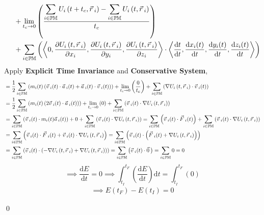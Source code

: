 \documentclass[12pt]{amsart}
\renewenvironment{proof}{{\bfseries Proof.}}{\qed}
\let\oldvec\vec
\renewcommand{\vec}[1]{\oldvec{#1}\hspace{0.1em}}
\begin{document}
\begin{proof}
\begin{align*}
& \quad \ + \lim_{t_c \to 0} \left ( \dfrac{ \displaystyle \sum_{i \in \mathbb{PM}}  U_i \left ( t+t_c, \vec{r}_i \right ) - \displaystyle \sum_{i \in \mathbb{PM}}  U_i \left ( t, \vec{r}_i \right ) }{t_c} \right ) \\
& \quad \ +  \displaystyle \sum_{i \in \mathbb{PM}} \left ( \left < 0, \dfrac{\partial  U_i \left ( t, \vec{r}_i \right )}{\partial x_i},\dfrac{\partial  U_i \left ( t, \vec{r}_i \right )}{\partial y_i}, \dfrac{\partial  U_i \left ( t, \vec{r}_i \right )}{\partial z_i} \right > \cdot \left < \dfrac{\mathrm{d} t}{\mathrm{d} t}, \dfrac{\mathrm{d} x_i(t)}{\mathrm{d} t}, \dfrac{\mathrm{d} y_i(t)}{\mathrm{d} t}, \dfrac{\mathrm{d} z_i(t)}{\mathrm{d} t}\right > \right )
\end{align*}
Apply \textbf{Explicit Time Invariance} and \textbf{Conservative System},
\begin{align*}
&= \dfrac{1}{2}\displaystyle\sum_{i \in \mathbb{PM}}\left( m_i (t) \left ( \vec{v}_i (t) \cdot \vec{a}_i (t) + \vec{a}_i (t) \cdot \vec{v}_i (t)\right) \right ) + \lim_{t_c \to 0} \left ( \dfrac{ 0 }{t_c} \right ) +  \displaystyle \sum_{i \in \mathbb{PM}} \left ( \nabla U_i \left ( t, \vec{r}_i \right )  \cdot \vec{v}_i (t) \right ) \\
&= \dfrac{1}{2}\displaystyle\sum_{i \in \mathbb{PM}}\left( m_i (t) \left ( 2 \vec{v}_i (t) \cdot \vec{a}_i (t)\right) \right ) + \lim_{t_c \to 0} \left (0 \right ) +  \displaystyle \sum_{i \in \mathbb{PM}} \left ( \vec{v}_i (t) \cdot \nabla U_i \left ( t, \vec{r}_i \right )  \right ) \\
&= \displaystyle\sum_{i \in \mathbb{PM}}\left( \vec{v}_i (t) \cdot m_i (t) \vec{a}_i (t) \right) + 0+\displaystyle \sum_{i \in \mathbb{PM}} \left ( \vec{v}_i (t) \cdot \nabla U_i \left ( t, \vec{r}_i \right )  \right ) = \displaystyle\sum_{i \in \mathbb{PM}}\left( \vec{v}_i (t) \cdot \vec{F}_i (t) \right) + \displaystyle \sum_{i \in \mathbb{PM}} \left ( \vec{v}_i (t) \cdot \nabla U_i \left ( t, \vec{r}_i \right )  \right ) \\ 
&= \displaystyle\sum_{i \in \mathbb{PM}}\left( \vec{v}_i (t) \cdot \vec{F}_i (t) + \vec{v}_i (t) \cdot \nabla U_i \left ( t, \vec{r}_i \right )  \right) = \displaystyle\sum_{i \in \mathbb{PM}}\left( \vec{v}_i (t) \cdot \left ( \vec{F}_i (t) + \nabla U_i \left ( t, \vec{r}_i \right )  \right ) \right) \\
&= \displaystyle\sum_{i \in \mathbb{PM}}\left( \vec{v}_i (t) \cdot \left (- \nabla U_i \left ( t, \vec{r}_i \right )  + \nabla U_i \left ( t, \vec{r}_i \right )  \right ) \right) = \displaystyle\sum_{i \in \mathbb{PM}}\left( \vec{v}_i (t) \cdot \vec{0} \right) = \displaystyle\sum_{i \in \mathbb{PM}} 0 = 0\\
\end{align*}
$$\implies \dfrac{\mathrm{d} E}{\mathrm{d} t} = 0 \implies \int^{t_F}_{t_I} \left( \dfrac{\mathrm{d} E}{\mathrm{d} t} \right ) \mathrm{d} t = \int^{t_F}_{t_I} \left( 0 \right ) $$
\begin{align*}\implies  E(t_F) -  E(t_I) = 0 \end{align*}

\end{proof}
\end{document}
